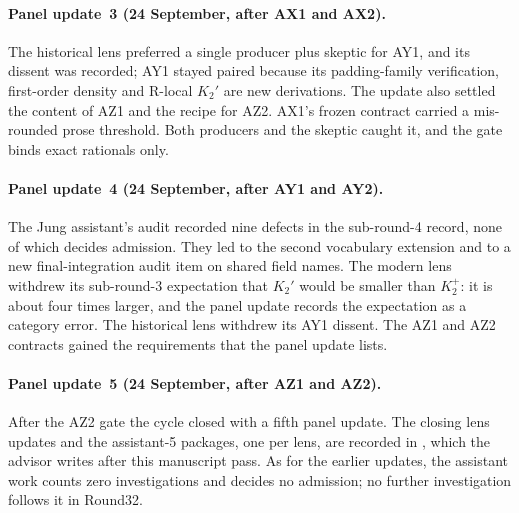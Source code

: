 \paragraph{Panel update~3 (24 September, after AX1 and AX2).}
The historical lens preferred a single producer plus skeptic for AY1, and its
dissent was recorded; AY1 stayed paired because its padding-family
verification, first-order density and R-local $K_2'$ are new derivations. The
update also settled the content of AZ1 and the recipe for AZ2. AX1's frozen
contract carried a mis-rounded prose threshold. Both producers and the
skeptic caught it, and the gate binds exact rationals only.

\paragraph{Panel update~4 (24 September, after AY1 and AY2).}
The Jung assistant's audit recorded nine defects in the sub-round-4 record,
none of which decides admission. They led to the second vocabulary extension and to a
new final-integration audit item on shared field names. The modern lens
withdrew its sub-round-3 expectation that $K_2'$ would be smaller than
$K_2^+$: it is about four times larger, and the panel update records the
expectation as a category error. The historical lens withdrew its AY1 dissent.
The AZ1 and AZ2 contracts gained the requirements that the panel update
lists.

\paragraph{Panel update~5 (24 September, after AZ1 and AZ2).}
After the AZ2 gate the cycle closed with a fifth panel update. The closing
lens updates and the assistant-5 packages, one per lens, are recorded in
, which the
advisor writes after this manuscript pass. As for the earlier updates, the
assistant work counts zero investigations and decides no admission; no
further investigation follows it in Round32.

